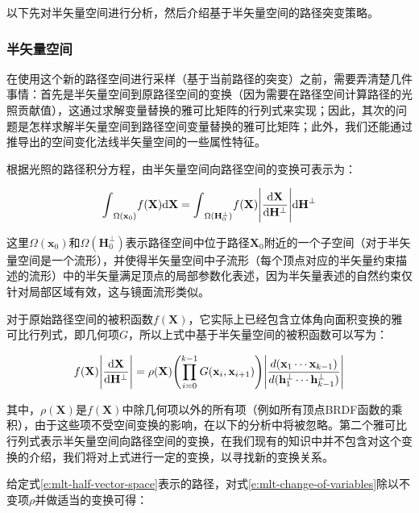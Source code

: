 以下先对半矢量空间进行分析，然后介绍基于半矢量空间的路径突变策略。





\subsubsection{半矢量空间}\label{sec:mlt-half-vector-space}
在使用这个新的路径空间进行采样（基于当前路径的突变）之前，需要弄清楚几件事情：首先是半矢量空间到原路径空间的变换（因为需要在路径空间计算路径的光照贡献值），这通过求解变量替换的雅可比矩阵的行列式来实现；因此，其次的问题是怎样求解半矢量空间到路径空间变量替换的雅可比矩阵；此外，我们还能通过推导出的空间变化法线半矢量空间的一些属性特征。

根据光照的路径积分方程，由半矢量空间向路径空间的变换可表示为：

\begin{equation}
	{\rm \int}_{\Omega(\mathbf{x}_0)}f(\mathbf{X}){\rm d}\mathbf{X}={\rm \int}_{\Omega(\mathbf{H}^{\perp}_{0})}f(\mathbf{X})\Bigg|\frac{{\rm d}\mathbf{X}}{{\rm d}\mathbf{H}^{\perp}}\Bigg| {\rm d}\mathbf{H}^{\perp}
\end{equation}

\noindent 这里$\Omega(\mathbf{x}_0)$和$\Omega(\mathbf{H}^{\perp}_{0})$表示路径空间中位于路径$\mathbf{X}_0$附近的一个子空间（对于半矢量空间是一个流形），并使得半矢量空间中子流形（每个顶点对应的半矢量约束描述的流形）中的半矢量满足顶点的局部参数化表述，因为半矢量表述的自然约束仅针对局部区域有效，这与镜面流形类似。

对于原始路径空间的被积函数$f(\mathbf{X})$，它实际上已经包含立体角向面积变换的雅可比行列式，即几何项$G$，所以上式中基于半矢量空间的被积函数可以写为：

\begin{equation}\label{e:mlt-change-of-variables}
	f(\mathbf{X})\Bigg|\frac{{\rm d}\mathbf{X}}{{\rm d}\mathbf{H}^{\perp}}\Bigg|=\rho(\mathbf{X})\Biggl(\prod^{k-1}_{i=0}G(\mathbf{x}_i,\mathbf{x}_{i+1})\Biggl)\Bigg|\frac{d(\mathbf{x}_1\cdots\mathbf{x}_{k-1})}{d(\mathbf{h}^{\perp}_1\cdots\mathbf{h}^{\perp}_{k-1})}\Bigg|
\end{equation}

\noindent 其中，$\rho(\mathbf{X})$是$f(\mathbf{X})$中除几何项以外的所有项（例如所有顶点BRDF函数的乘积），由于这些项不受空间变换的影响，在以下的分析中将被忽略。第二个雅可比行列式表示半矢量空间向路径空间的变换，在我们现有的知识中并不包含对这个变换的介绍，我们将对上式进行一定的变换，以寻找新的变换关系。

给定式\ref{e:mlt-half-vector-space}表示的路径，对式\ref{e:mlt-change-of-variables}除以不变项$\rho$并做适当的变换可得：

